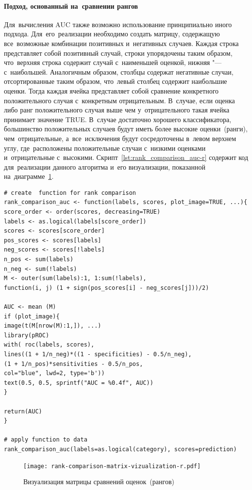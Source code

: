 \documentclass[]{scrreprt}
\begin{document}
\paragraph{Подход, основанный на~сравнении рангов}
Для~вычисления AUC также возможно использование принципиально иного подхода. Для~его~реализации необходимо создать матрицу, содержащую все~возможные комбинации позитивных и~негативных случаев. Каждая строка представляет собой позитивный случай, строки упорядочены таким образом, что~верхняя строка содержит случай с~наименьшей оценкой, нижняя "--- с~наибольшей. Аналогичным образом, столбцы содержат негативные случаи, отсортированные таким образом, что~левый столбец содержит наибольшие оценки. Тогда каждая ячейка представляет собой сравнение конкретного положительного случая с~конкретным отрицательным. В~случае, если оценка либо ранг положительного случая выше чем у~отрицательного такая ячейка принимает значение TRUE. В~случае достаточно хорошего классификатора, большинство положительных случаев будут иметь более высокие оценки~(ранги), чем~отрицательные, а~все~исключения будут сосредоточены в~левом верхнем углу, где~расположены положительные случаи с~низкими оценками и~отрицательные с~высокими. Скрипт~\ref{lst:rank_comparison_auc-r} содержит код для~реализации данного алгоритма и~его визуализации, показанной на~диаграмме~\ref{fig:rank-comparison-matrix-vizualization-r}.
%
\begin{lstlisting}[float, caption = Создание функции для~матрицы сравнений и~её~применение к~тестовым данным, firstnumber=1, label= lst:rank_comparison_auc-r]
# create  function for rank comparison
rank_comparison_auc <- function(labels, scores, plot_image=TRUE, ...){
score_order <- order(scores, decreasing=TRUE)
labels <- as.logical(labels[score_order])
scores <- scores[score_order]
pos_scores <- scores[labels]
neg_scores <- scores[!labels]
n_pos <- sum(labels)
n_neg <- sum(!labels)
M <- outer(sum(labels):1, 1:sum(!labels), 
function(i, j) (1 + sign(pos_scores[i] - neg_scores[j]))/2)

AUC <- mean (M)
if (plot_image){
image(t(M[nrow(M):1,]), ...)
library(pROC)
with( roc(labels, scores),
lines((1 + 1/n_neg)*((1 - specificities) - 0.5/n_neg), 
(1 + 1/n_pos)*sensitivities - 0.5/n_pos, 
col="blue", lwd=2, type='b'))
text(0.5, 0.5, sprintf("AUC = %0.4f", AUC))
}

return(AUC)
}

# apply function to data
rank_comparison_auc(labels=as.logical(category), scores=prediction)
\end{lstlisting}
%
\begin{figure}[ht]
	\centering
	\texttt{[image: rank-comparison-matrix-vizualization-r.pdf]}
	\caption{Визуализация матрицы сравнений оценок~(рангов)}
	\label{fig:rank-comparison-matrix-vizualization-r}
\end{figure}
%
\end{document}

